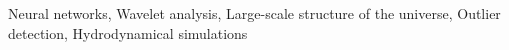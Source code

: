 \documentclass[]{article}
\begin{document}
Neural networks, Wavelet analysis, Large-scale structure of the universe, Outlier detection, Hydrodynamical simulations
\end{document}
